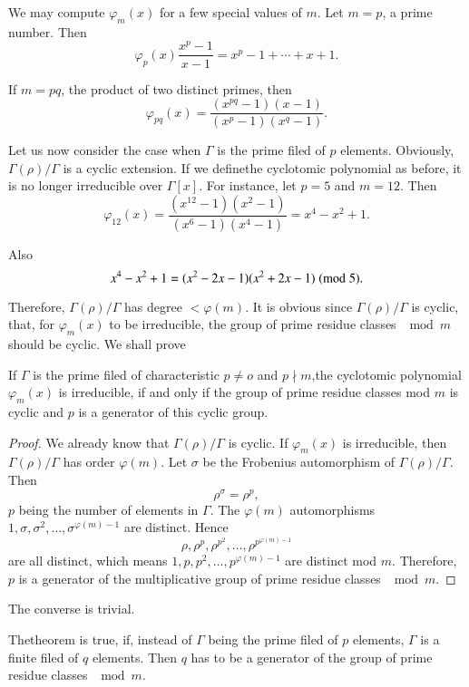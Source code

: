 We may compute $\varphi_m (x)$ for a few special values of $m$. Let $
m=p $, a prime number. Then  
$$
\varphi_p(x) \frac{x^p -1}{x-1} = x^p-1 +\cdots+ x+1.
$$

If $m=pq$, the product of two distinct primes, then
$$
\varphi_{pq} (x) = \frac{(x^{pq}-1) (x-1)} {(x^p-1) (x^q-1)}.
$$

Let us now consider the case when $\Gamma$ is the prime filed of $p$
elements. Obviously, $\Gamma (\rho) /\Gamma$ is a cyclic
extension. If we define\pageoriginale the cyclotomic polynomial as
before, it is no longer irreducible over $\Gamma [x]$. For instance,
let $p=5$ and $m=12$. Then  
$$
\varphi_{12} (x) = \frac{(x^{12}-1) (x^2-1)} {(x^6-1) (x^4-1)} = x^4-x^2 +1.
$$

Also
$$
x^4 -x^2+1 = (x^2-2x-1) (x^2+2x-1) \; ({\rm mod } \; 5).
$$

Therefore, $\Gamma(\rho) / \Gamma$ has degree $< \varphi (m)$. It is
obvious since $\Gamma (\rho) / \Gamma$ is cyclic, that, for
$\varphi_m(x)$ to be irreducible, the group of prime residue classes $\mod m$
should be cyclic. We shall prove 

\begin{thm}\label{c6:thm4}%
If $\Gamma$ is the prime filed of characteristic $p \neq o$ and
  $p \nmid m$,the cyclotomic polynomial $\varphi_m(x)$ is irreducible,
  if  and only if the group of prime residue classes mod $m$ is cyclic
  and $p$ is a generator of this cyclic group. 
 \end{thm} 

 \begin{proof}
We already know that $\Gamma (\rho) / \Gamma$ is cyclic. If $\varphi_m
(x)$ is irreducible, then $\Gamma (\rho) / \Gamma$ has order
$\varphi(m)$. Let $\sigma$ be the Frobenius automorphism of $\Gamma
(\rho) / \Gamma$. Then 
$$
\rho^\sigma = \rho^p,
$$
$p$ being the number of elements in $\Gamma$. The $\varphi(m)$
automorphisms \break $1, \sigma, \sigma ^2 ,\ldots, \sigma
^{\varphi(m)-1}$ are distinct. Hence   
$$
\rho, \rho^p, \rho^{p^2} ,\ldots, \rho^{p^{\varphi(m)-1}} 
$$
are all distinct, which means $1,p,p^2, \ldots, p^{\varphi (m)-1}$ are
distinct mod $m$. Therefore, $p$ is a generator of the multiplicative
group of prime residue classes $\mod m$.  
\end{proof} 

The converse is trivial.
 
 The\pageoriginale theorem is true, if, instead of $\Gamma$ being the
 prime filed of  $p$ elements, $\Gamma$ is a finite filed of $q$
 elements. Then $q$  has to be a generator of the group of prime
 residue classes $\mod m$.    


